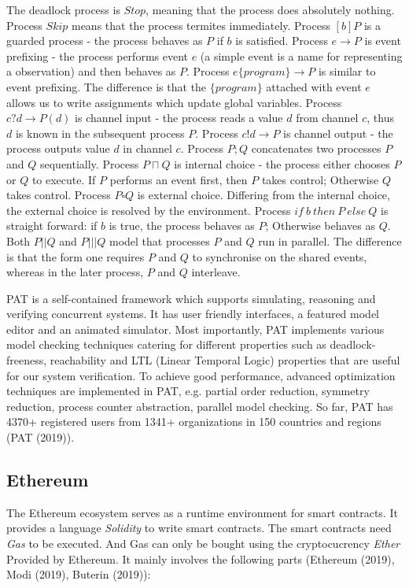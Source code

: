 \documentclass{KERauth}
\begin{document}
The deadlock process is $Stop$, meaning that the process does absolutely nothing. Process $Skip$ means that the process termites immediately. Process $[b]P$ is a guarded process - the process behaves as $P$ if $b$ is satisfied. Process $e \rightarrow  P$ is event prefixing - the process performs event $e$ (a simple event is a name for representing a observation) and then behaves as $P$. Process $e \{program\} \rightarrow P$ is similar to event prefixing. The difference is that the $\{program\}$ attached with event $e$ allows us to write assignments which update global variables. Process $c?d \rightarrow P(d)$ is channel input - the process reads a value $d$ from channel $c$, thus $d$ is known in the subsequent process $P$. Process $c!d \rightarrow P$ is channel output - the process outputs value $d$ in channel $c$. Process $P; Q$ concatenates two processes $P$ and $Q$ sequentially. Process $P \sqcap Q$ is internal choice - the process either chooses $P$ or $Q$ to execute. If $P$ performs an event first, then $P$ takes control; Otherwise $Q$ takes control. Process $P \square Q$ is external choice. Differing from the internal choice, the external choice is resolved by the environment. Process $if\ b\ then\ P\ else\ Q$ is straight forward: if $b$ is true, the process behaves as $P$; Otherwise behaves as $Q$. Both $P || Q $ and $P ||| Q$ model that processes $P$ and $Q$ run in parallel. The difference is that the form one requires $P$ and $Q$ to synchronise on the shared events, whereas in the later process, $P$ and $Q$ interleave.

PAT is a self-contained framework which supports simulating, reasoning and verifying concurrent systems. It has user friendly interfaces, a featured model editor and an animated simulator. Most importantly, PAT implements various model checking techniques catering for different properties such as deadlock-freeness, reachability and LTL (Linear Temporal Logic) properties that are useful for our system verification. To achieve good performance, advanced optimization techniques are implemented in PAT, e.g. partial order reduction, symmetry reduction, process counter abstraction, parallel model checking. So far, PAT has 4370+ registered users from 1341+ organizations in 150 countries and regions (PAT (2019)).

\subsection{Ethereum}

The Ethereum ecosystem serves as a runtime environment for smart contracts. It provides a language \emph{Solidity} to write smart contracts. The smart contracts need \emph{Gas} to be executed. And Gas can only be bought using the cryptocucrency \emph{Ether} Provided by Ethereum. It mainly involves the following parts (Ethereum (2019), Modi (2019), Buterin (2019)): 
\end{document}
